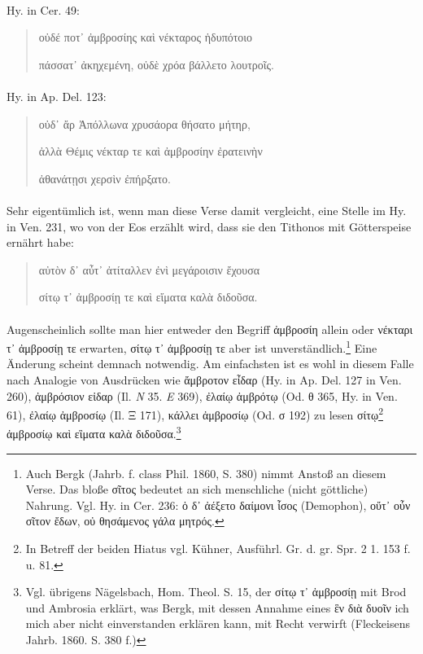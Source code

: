 \documentclass[a4paper, 11pt, oneside]{article}
\begin{document}
\paragraph{}
Hy. in Cer. 49:
\begin{quotation}
οὐδέ ποτ᾽ ἀμβροσίης καὶ νέκταρος ἡδυπότοιο

πάσσατ᾽ ἀκηχεμένη, οὐδὲ χρόα βάλλετο λουτροῖς.
\end{quotation}
\paragraph{}
Hy. in Ap. Del. 123:
\begin{quotation}
οὐδ᾽ ἄρ Ἀπόλλωνα χρυσάορα θήσατο μήτηρ,

ἀλλὰ Θέμις νέκταρ τε καὶ ἀμβροσίην ἐρατεινὴν

ἀθανάτῃσι χερσὶν ἐπήρξατο.
\end{quotation}
\paragraph{}
Sehr eigentümlich ist, wenn man diese Verse damit vergleicht, eine Stelle im Hy. in Ven. 231, wo von der Eos erzählt wird, dass sie den Tithonos mit Götterspeise ernährt habe:
\begin{quotation}
αὐτὸν δ᾽ αὖτ᾽ ἀτίταλλεν ἐνὶ μεγάροισιν ἔχουσα

σίτῳ τ᾿ ἀμβροσίῃ τε καὶ εἴματα καλὰ διδοῦσα.
\end{quotation}
\paragraph{}
Augenscheinlich sollte man hier entweder den Begriff ἀμβροσίη allein oder νέκταρι τ᾽ ἀμβροσίῃ τε erwarten, σίτῳ τ᾽ ἀμβροσίῃ τε aber ist unverständlich.\footnote{Auch Bergk (Jahrb. f. class Phil. 1860, S. 380) nimmt Anstoß an diesem Verse. Das bloße σῖτος bedeutet an sich menschliche (nicht göttliche) Nahrung. Vgl. Hy. in Cer. 236: ὁ δ᾽ ἀέξετο δαίμονι ἶσος (Demophon), οὔτ᾽ οὖν σῖτον ἔδων, οὐ θησάμενος γάλα μητρός.} Eine Änderung scheint demnach notwendig. Am einfachsten ist es wohl in diesem Falle nach Analogie von Ausdrücken wie ἄμβροτον εἶδαρ (Hy. in Ap. Del. 127 in Ven. 260), ἀμβρόσιον εἰδαρ (Il. \emph{N} 35. \emph{E} 369), ἐλαίῳ ἀμβρότῳ (Od. θ 365, Hy. in Ven. 61), ἐλαίῳ ἀμβροσίῳ (Il. Ξ 171), κάλλει ἀμβροσίῳ (Od. σ 192) zu lesen σίτῳ\footnote{In Betreff der beiden Hiatus vgl. Kühner, Ausführl. Gr. d. gr. Spr. 2 1. 153 f. u. 81.} ἀμβροσίῳ καὶ εἳματα καλὰ διδοῦσα.\footnote{Vgl. übrigens Nägelsbach, Hom. Theol. S. 15, der σίτῳ τ᾽ ἀμβροσίῃ mit Brod und Ambrosia erklärt, was Bergk, mit dessen Annahme eines ἓν διὰ δυοῖν ich mich aber nicht einverstanden erklären kann, mit Recht verwirft (Fleckeisens Jahrb. 1860. S. 380 f.)}
\end{document}
